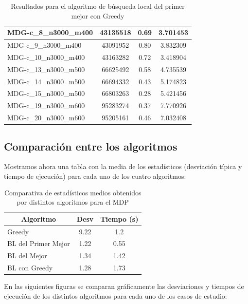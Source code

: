 \documentclass[11pt,a4paper]{article}
\begin{document}
\begin{table}[H]
\begin{center}
\begin{tabular}{|l|c|c|c|}
			MDG-c\_8\_n3000\_m400 & 43135518 & 0.69 & 3.701453 \\ \hline
			MDG-c\_9\_n3000\_m400 & 43091952 & 0.80 & 3.832309 \\ \hline
			MDG-c\_10\_n3000\_m400 & 43163282 & 0.72 & 3.418904 \\ \hline
			MDG-c\_13\_n3000\_m500 & 66625492 & 0.58 & 4.735539 \\ \hline
			MDG-c\_14\_n3000\_m500 & 66694332 & 0.43 & 5.174823 \\ \hline
			MDG-c\_15\_n3000\_m500 & 66803263 & 0.28 & 5.421456 \\ \hline
			MDG-c\_19\_n3000\_m600 & 95283274 & 0.37 & 7.770926 \\ \hline
			MDG-c\_20\_n3000\_m600 & 95205161 & 0.46 & 7.032408 \\ \hline
		\end{tabular}
	\end{center}
	\caption{Resultados para el algoritmo de búsqueda local del primer mejor con Greedy}
	\label{}
\end{table}

\subsection{Comparación entre los algoritmos}
Mostramos ahora una tabla con la media de los estadísticos (desviación típica y tiempo de ejecución) para cada uno de los cuatro algoritmos:
\begin{table}[H]
	\begin{center}
		\begin{tabular}{|l|c|c|}
			\hline
			\multicolumn{1}{|c|}{\textbf{Algoritmo}} & \textbf{Desv} & \textbf{Tiempo (s)} \\ \hline
			Greedy & 9.22 & 1.2 \\ \hline
			BL del Primer Mejor & 1.22 & 0.55 \\ \hline
			BL del Mejor & 1.34 & 1.42 \\ \hline
			BL con Greedy & 1.28 & 1.73 \\ \hline
		\end{tabular}
	\end{center}
	\caption{Comparativa de estadísticos medios obtenidos por distintos algoritmos para el MDP}
	\label{}
\end{table}

En las siguientes figuras se comparan gráficamente las desviaciones y tiempos de ejecución de los distintos algoritmos para cada uno de los casos de estudio:
\end{document}

